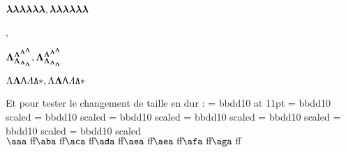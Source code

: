 \documentclass{article}
\begin{document}
$\testddd{\dlambda}, \testddd{\dlambda}$

\testd{$\dLambda$}, \testd{$\dLambda$}

$\testdd{\dLambda}, \testdd{\dLambda}$

$\testddd{\dLambda}, \testddd{\dLambda}$
%
%

Et pour tester le changement de taille en dur :
\font\aaa = bbdd10 at 11pt
\font\aba = bbdd10 scaled 
\font\aca = bbdd10 scaled \magstephalf
\font\ada = bbdd10 scaled 
\font\aea = bbdd10 scaled 
\font\afa = bbdd10 scaled 
\font\aga = bbdd10 scaled 
\font\aha = bbdd10 scaled 
$\hbox{\aaa \char '033}\hbox{\aba \char '033}\hbox{\aca \char '033}
\hbox{\ada \char '033}\hbox{\aea \char '033}\hbox{\aea \char '033}
\hbox{\afa \char '033}\hbox{\aga \char '033}$
%
\end{document}
